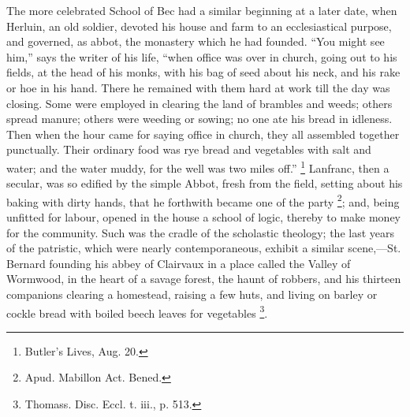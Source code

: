The more celebrated School of Bec had a similar beginning at a
later date, when Herluin, an old soldier, devoted his house and farm
to an ecclesiastical purpose, and governed, as abbot, the monastery
which he had founded. ``You might see him,'' says the writer
of his life, ``when office was over in church, going out to his
fields, at the head of his monks, with his bag of seed about his neck,
and his rake or hoe in his hand. There he remained with them hard at
work till the day was closing. Some were employed in clearing the land
of brambles and weeds; others spread manure; others were weeding or
sowing; no one ate his bread in idleness. Then when the hour came for
saying office in church, they all assembled together punctually. Their
ordinary food was rye bread and vegetables with salt and water; and
the water muddy, for the well was two miles off.'' \footnote{Butler's
Lives, Aug. 20.} Lanfranc, then a secular, was so edified by the simple Abbot,
fresh from the field, setting about his baking with dirty hands, that
he forthwith became one of the party \footnote{Apud.
Mabillon Act. Bened.}; and, being unfitted for labour, opened in the house a school
of logic, thereby to make money for the community. Such was the cradle
of the scholastic theology; the last years of the patristic, which
were nearly contemporaneous, exhibit a similar scene,—St.
Bernard founding his abbey of Clairvaux in a place called the Valley
of Wormwood, in the heart of a savage forest, the haunt of robbers,
and his thirteen companions clearing a homestead, raising a few huts,
and living on barley or cockle bread with boiled beech leaves for
vegetables \footnote{Thomass.
Disc. Eccl. t. iii., p. 513.}.

